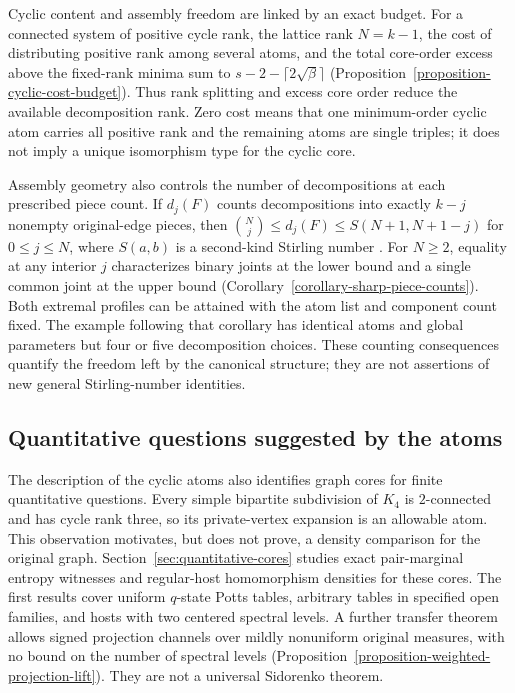 \documentclass[a4paper,11pt,reqno]{amsart}
\theoremstyle{plain}
\theoremstyle{definition}
\theoremstyle{remark}
\begin{document}
Cyclic content and assembly freedom are linked by an exact budget.  For a
connected system of positive cycle rank, the lattice rank \(N=k-1\), the
cost of distributing positive rank among several atoms, and the total
core-order excess above the fixed-rank minima sum to
\(s-2-\lceil2\sqrt{\beta}\rceil\)
(Proposition~\ref{proposition-cyclic-cost-budget}).  Thus rank splitting
and excess core order reduce the available decomposition rank.  Zero cost
means that one minimum-order cyclic atom carries all positive rank and
the remaining atoms are single triples; it does not imply a unique
isomorphism type for the cyclic core.

Assembly geometry also controls the number of decompositions at each
prescribed piece count.  If \(d_j(F)\) counts decompositions into exactly
\(k-j\) nonempty original-edge pieces, then
\(\binom Nj\le d_j(F)\le S(N+1,N+1-j)\) for \(0\le j\le N\), where
\(S(a,b)\) is a second-kind Stirling number \citep{comtet1974}.
For \(N\ge2\), equality at any interior \(j\) characterizes binary joints
at the lower bound and a single common joint at the upper bound
(Corollary~\ref{corollary-sharp-piece-counts}).  Both extremal profiles can
be attained with the atom list and component count fixed.  The example
following that corollary has identical atoms and global parameters but
four or five decomposition choices.  These counting consequences quantify
the freedom left by the canonical structure; they are not assertions of
new general Stirling-number identities.

\subsection*{Quantitative questions suggested by the atoms}
The description of the cyclic atoms also identifies graph cores for finite
quantitative questions.  Every simple bipartite subdivision of $K_4$ is
$2$-connected and has cycle rank three, so its private-vertex expansion is
an allowable atom.  This observation motivates, but does not prove, a density
comparison for the original graph.  Section~\ref{sec:quantitative-cores}
studies exact pair-marginal entropy witnesses and regular-host homomorphism
densities for these cores.  The first results cover uniform $q$-state Potts
tables, arbitrary tables in specified open families, and hosts with two
centered spectral levels.  A further transfer theorem allows signed
projection channels over mildly nonuniform original measures, with no
bound on the number of spectral levels
(Proposition~\ref{proposition-weighted-projection-lift}).
They are not a universal Sidorenko theorem.
\end{document}

